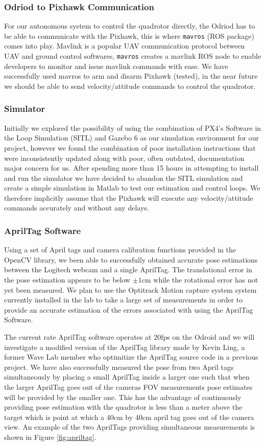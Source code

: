 \documentclass{article}[12pt]
\begin{document}
\subsubsection*{Odriod to Pixhawk Communication}
For our autonomous system to control the quadrotor directly, the Odriod has to 
be able to communicate with the Pixhawk, this is where \verb|mavros| (ROS 
package) comes into play. Mavlink is a popular UAV communication protocol 
between UAV and ground control softwares, \verb|mavros| creates a mavlink ROS 
node to enable developers to monitor and issue mavlink commands with ease. We 
have successfully used mavros to arm and disarm Pixhawk (tested), in the near 
future we should be able to send velocity/attitude commands to control the 
quadrotor.

\subsubsection*{Simulator}
Initially we explored the possibility of using the combination of PX4's 
Software in the Loop Simulation (SITL) and Gazebo 6 as our simulation 
environment for our project, however we found the combination of poor installation instructions that were inconsistently updated along with poor, often outdated, documentation major concern for us. After spending more than 15 hours in attempting to install and run the simulator we have decided to abandon the SITL simulation and create a simple simulation in Matlab to test our estimation and control loops. We therefore implicitly assume that the Pixhawk will execute any velocity/attitude commands accurately and without any delays. 

\subsubsection*{AprilTag Software}
Using a set of April tags and camera calibration functions provided in the OpenCV library, we been able to successfully obtained accurate pose estimations between the Logitech webcam and a single AprilTag. The translational error in the pose estimation appears to be below $\pm 1$cm while the rotational error has not yet been measured. We plan to use the Optitrack Motion capture system system currently installed in the lab to take a large set of measurements in order to provide an accurate estimation of the errors associated with using the AprilTag Software. 

The current rate AprilTag software operates at 20fps on the Odroid and we will investigate a modified version of the AprilTag library made by Kevin Ling, a former Wave Lab member who optimitize the AprilTag source code in a previous project. We have also successfully measured the pose from two April tags simultaneously by placing a small AprilTag inside a larger one such that when the larger AprilTag goes out of the cameras FOV measurements pose estimates will be provided by the smaller one. This has the advantage of continuously providing pose estimation with the quadrotor is less than a meter above the target which is point at which a 40cm by 40cm april tag goes out of the camera view. An example of the two AprilTags providing simultaneous measurements is shown in Figure \ref{fig:apriltag}.
\end{document}
